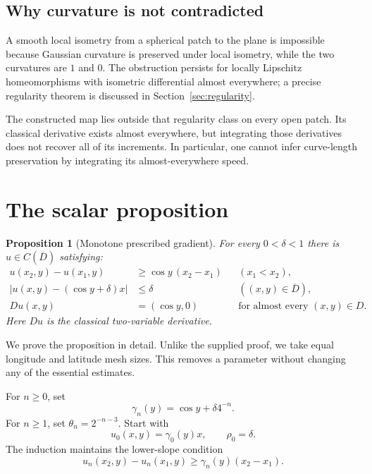 \documentclass[11pt,letterpaper]{article}
\numberwithin{equation}{section}
\newtheorem{proposition}[theorem]{Proposition}
\theoremstyle{remark}
\newcommand{\closure}[1]{\overline{#1}}
\begin{document}
\subsection{Why curvature is not contradicted}

A smooth local isometry from a spherical patch to the plane is impossible because Gaussian curvature is preserved under local isometry, while the two curvatures are $1$ and $0$. The obstruction persists for locally Lipschitz homeomorphisms with isometric differential almost everywhere; a precise regularity theorem is discussed in Section~\ref{sec:regularity}.

The constructed map lies outside that regularity class on every open patch. Its classical derivative exists almost everywhere, but integrating those derivatives does not recover all of its increments. In particular, one cannot infer curve-length preservation by integrating its almost-everywhere speed.

\FloatBarrier
\section{The scalar proposition}
\label{sec:scalar}

\begin{proposition}[Monotone prescribed gradient]
\label{prop:scalar}
For every $0<\delta<1$ there is $u\in C(\closure D)$ satisfying:
\begin{align}
 u(x_2,y)-u(x_1,y)&\ge\cos y\,(x_2-x_1)
 &&(x_1<x_2),\label{eq:mono}\\
 |u(x,y)-(\cos y+\delta)x|&\le\delta
 &&((x,y)\in\closure D),\label{eq:close}\\
 Du(x,y)&=(\cos y,0)
 &&\text{for almost every }(x,y)\in D.\label{eq:gradient}
\end{align}
Here $Du$ is the classical two-variable derivative.
\end{proposition}

We prove the proposition in detail. Unlike the supplied proof, we take equal longitude and latitude mesh sizes. This removes a parameter without changing any of the essential estimates.

For $n\ge0$, set
\[
 \gamma_n(y)=\cos y+\delta4^{-n}.
\]
For $n\ge1$, set $\theta_n=2^{-n-3}$. Start with
\[
 u_0(x,y)=\gamma_0(y)x,\qquad\rho_0=\delta.
\]
The induction maintains the lower-slope condition
\begin{equation}\label{eq:H}
 u_n(x_2,y)-u_n(x_1,y)\ge\gamma_n(y)(x_2-x_1).
 \tag{$H_n$}
\end{equation}
\end{document}
